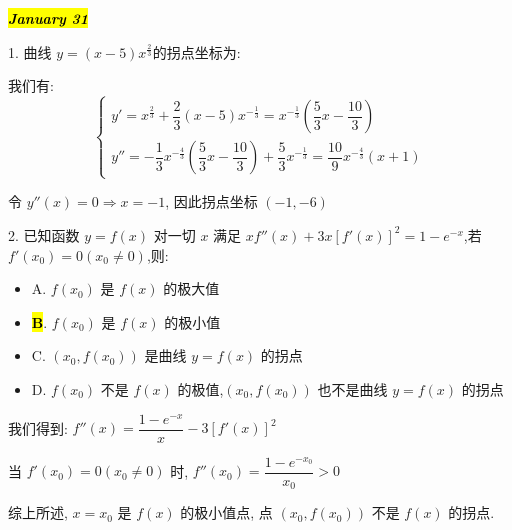 \hl{\textbf{\textit{January 31}}}

1. 曲线 $y=(x-5)x^{\frac{2}{3}}$的拐点坐标为:
\begin{solution}

	我们有:
	$$\begin{cases}
		y' = x^{\frac{2}{3}}+\dfrac{2}{3}(x-5)x^{-\frac{1}{3}} = x^{-\frac{1}{3}}(\dfrac{5}{3}x-\dfrac{10}{3})\\
		y''= -\dfrac{1}{3}x^{-\frac{4}{3}}(\dfrac{5}{3}x-\dfrac{10}{3})+\dfrac{5}{3}x^{-\frac{1}{3}} = \dfrac{10}{9}x^{-\frac{4}{3}}(x+1) 
	\end{cases}$$

	令 $y''(x) = 0\Rightarrow x =-1$, 因此拐点坐标 $(-1,-6)$
\end{solution}

2. 已知函数 $y=f(x)$ 对一切 $x$ 满足 $xf''(x)+3x[f'(x)]^{2}=1-e^{-x}$,若 $f'(x_{0})=0(x_{0}\neq 0)$,则:
\begin{itemize}
	\item A. $f(x_{0})$ 是 $f(x)$ 的极大值
	\item \hl{\textbf{B}}. $f(x_{0})$ 是 $f(x)$ 的极小值
	\item C. $(x_{0},f(x_{0}))$ 是曲线 $y=f(x)$ 的拐点
	\item D. $f(x_{0})$ 不是 $f(x)$ 的极值,$(x_{0},f(x_{0}))$ 也不是曲线 $y=f(x)$ 的拐点
\end{itemize}
\begin{solution}

	我们得到: $f''(x) = \dfrac{1-e^{-x}}{x} -3[f'(x)]^{2}$

	当 $f'(x_{0}) = 0(x_{0}\neq 0)$ 时, $f''(x_{0}) = \dfrac{1-e^{-x_{0}}}{x_{0}} > 0$

	综上所述, $x = x_{0}$ 是 $f(x)$ 的极小值点, 点 $(x_{0},f(x_{0}))$ 不是 $f(x)$ 的拐点.
\end{solution}

